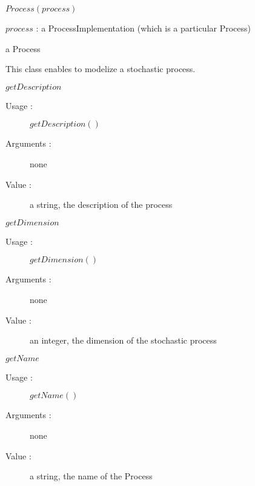 \begin{description}     
                        
\item[Usage :] \rule{0pt}{1em}
  \begin{description}
  \item $Process(process)$
  \end{description}
  \bigskip

\item[Arguments :]  \rule{0pt}{1em}
  \begin{description}
  \item $process$ : a ProcessImplementation (which is a particular Process) 
  \end{description} 
  \bigskip          

\item[Value :] a Process
  \rule{0pt}{1em}
  \begin{description}
  \item This class enables to modelize a stochastic process. 
  \end{description}
  \bigskip

\item[Some methods :]  \rule{0pt}{1em}

  \begin{description}

  \item $getDescription$
    \begin{description}
    \item[Usage :] $getDescription()$
    \item[Arguments :] none
    \item[Value :] a string, the description of the process
    \end{description}
    \bigskip

  \item $getDimension$
    \begin{description}
    \item[Usage :] $getDimension()$
    \item[Arguments :] none
    \item[Value :] an integer, the dimension of the stochastic process
    \end{description}
    \bigskip

  \item $getName$
    \begin{description}
    \item[Usage :] $getName()$
    \item[Arguments :] none
    \item[Value :] a string, the name of the Process
    \end{description}
    \bigskip


\end{description}
\end{description}
